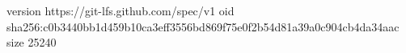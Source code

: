 version https://git-lfs.github.com/spec/v1
oid sha256:c0b3440bb1d459b10ca3eff3556bd869f75e0f2b54d81a39a0c904cb4da34aac
size 25240
